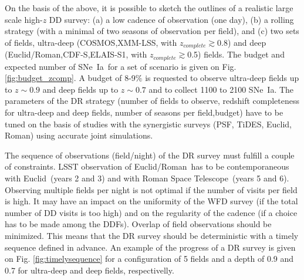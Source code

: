 \documentclass[skiphelvet,twocolumn]{aastex63}
\newcommand{\cosmos}{{COSMOS}}
\newcommand{\elais}{{ELAIS-S1}}
\newcommand{\xmm}{{XMM-LSS}}
\newcommand{\cdfs}{{CDF-S}}
\newcommand{\adfs}{{Euclid/Roman}}
\newcommand{\euclid}{{Euclid}}
\newcommand{\romanspace}{{\sc Roman Space Telescope}}
\newcommand{\sne}{{SNe~Ia}}
\newcommand{\zcomp}{\mbox{$z_{complete}$}}
\begin{document}
\par
On the basis of the above, it is possible to sketch the outlines of a realistic large scale high-$z$ DD survey: (a) a low cadence of observation (one day), (b) a rolling strategy (with a minimal of two seasons of observation per field), and (c) two sets of fields, ultra-deep (\cosmos,\xmm, with \zcomp$\gtrsim$0.8) and deep (\adfs,\cdfs,\elais, with \zcomp$\gtrsim$0.5) fields. The budget and expected number of \sne~for a set of scenario is given on Fig. \ref{fig:budget_zcomp}. A budget of 8-9$\%$ is requested to observe ultra-deep fields up to $z\sim0.9$ and deep fields up to $z\sim0.7$ and to collect 1100 to 2100 \sne. The parameters of the DR strategy (number of fields to observe, redshift completeness for ultra-deep and deep fields, number of seasons per field,budget) have to be tuned on the basis of studies with the synergistic surveys (PSF, TiDES, Euclid, Roman) using accurate joint simulations.
\par
The sequence of observations (field/night) of the DR survey must fulfill a couple of constraints. LSST observation of \adfs~has to be contemporaneous with \euclid~(years 2 and 3) and with \romanspace~(years 5 and 6). Observing multiple fields per night is not optimal if the number of visits per field is high. It may have an impact on the uniformity of the WFD survey (if the total number of DD visits is too high) and on the regularity of the cadence (if a choice has to be made among the DDFs). Overlap of field observations should be minimized. This means that the DR survey should be deterministic with a timely sequence defined in advance. An example of the progress of a DR survey is given on Fig. \ref{fig:timelysequence} for a configuration of 5 fields and a depth of 0.9 and 0.7 for ultra-deep and deep fields, respectivelly. 
\end{document}
